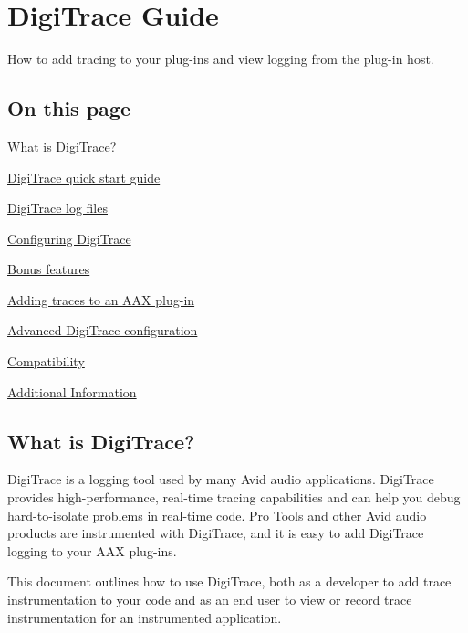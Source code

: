 \hypertarget{a00364}{}\section{Digi\+Trace Guide}
\label{a00364}
How to add tracing to your plug-\/ins and view logging from the plug-\/in host. 

\hypertarget{a00364_digitrace__contents}{}\subsection{On this page}\label{a00364_digitrace__contents}
\begin{DoxyItemize}
\item \hyperlink{a00364_digitrace__intro}{What is Digi\+Trace?} \item \hyperlink{a00364_digitrace__quickstart}{Digi\+Trace quick start guide} \item \hyperlink{a00364_digitrace__logfiles}{Digi\+Trace log files} \item \hyperlink{a00364_digitrace__configuring}{Configuring Digi\+Trace} \item \hyperlink{a00364_digitrace__bonus_features}{Bonus features} \item \hyperlink{a00364_digitrace__tracingfromplugins}{Adding traces to an A\+A\+X plug-\/in} \item \hyperlink{a00364_digitrace__advancedconfiguration}{Advanced Digi\+Trace configuration} \item \hyperlink{a00364_digitrace__compatibility}{Compatibility} \item \hyperlink{a00364_digitrace__additionalinformation}{Additional Information}\end{DoxyItemize}
 \hypertarget{a00364_digitrace__intro}{}\subsection{What is Digi\+Trace?}\label{a00364_digitrace__intro}
 Digi\+Trace is a logging tool used by many Avid audio applications. Digi\+Trace provides high-\/performance, real-\/time tracing capabilities and can help you debug hard-\/to-\/isolate problems in real-\/time code. Pro Tools and other Avid audio products are instrumented with Digi\+Trace, and it is easy to add Digi\+Trace logging to your A\+A\+X plug-\/ins.

 This document outlines how to use Digi\+Trace, both as a developer to add trace instrumentation to your code and as an end user to view or record trace instrumentation for an instrumented application.


